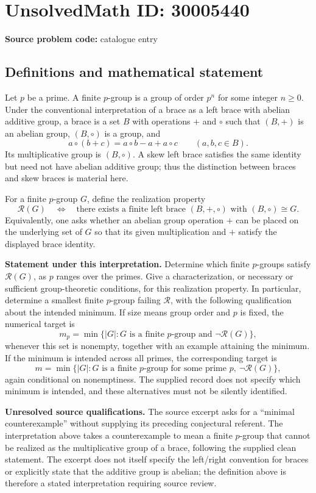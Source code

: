 \documentclass[11pt]{article}
\begin{document}
\section*{UnsolvedMath ID: 30005440}
\textbf{Source problem code:} catalogue entry
\subsection{Definitions and mathematical statement}
Let \(p\) be a prime. A finite \(p\)-group is a group of order \(p^n\) for some integer \(n\geq 0\). Under the conventional interpretation of a brace as a left brace with abelian additive group, a brace is a set \(B\) with operations \(+\) and \(\circ\) such that \((B,+)\) is an abelian group, \((B,\circ)\) is a group, and
\[
 a\circ(b+c)=a\circ b-a+a\circ c
 \qquad(a,b,c\in B).
\]
Its multiplicative group is \((B,\circ)\). A skew left brace satisfies the same identity but need not have abelian additive group; thus the distinction between braces and skew braces is material here.

For a finite \(p\)-group \(G\), define the realization property
\[
\mathcal R(G)\quad\Longleftrightarrow\quad
\text{there exists a finite left brace }(B,+,\circ)
\text{ with }(B,\circ)\cong G.
\]
Equivalently, one asks whether an abelian group operation \(+\) can be placed on the underlying set of \(G\) so that its given multiplication and \(+\) satisfy the displayed brace identity.

\textbf{Statement under this interpretation.} Determine which finite \(p\)-groups satisfy \(\mathcal R(G)\), as \(p\) ranges over the primes. Give a characterization, or necessary or sufficient group-theoretic conditions, for this realization property. In particular, determine a smallest finite \(p\)-group failing \(\mathcal R\), with the following qualification about the intended minimum. If size means group order and \(p\) is fixed, the numerical target is
\[
 m_p=\min\bigl\{|G|:G\text{ is a finite }p\text{-group and }\neg\mathcal R(G)\bigr\},
\]
whenever this set is nonempty, together with an example attaining the minimum. If the minimum is intended across all primes, the corresponding target is
\[
 m=\min\bigl\{|G|:G\text{ is a finite }p\text{-group for some prime }p,
 \ \neg\mathcal R(G)\bigr\},
\]
again conditional on nonemptiness. The supplied record does not specify which minimum is intended, and these alternatives must not be silently identified.

\textbf{Unresolved source qualifications.} The source excerpt asks for a ``minimal counterexample'' without supplying its preceding conjectural referent. The interpretation above takes a counterexample to mean a finite \(p\)-group that cannot be realized as the multiplicative group of a brace, following the supplied clean statement. The excerpt does not itself specify the left/right convention for braces or explicitly state that the additive group is abelian; the definition above is therefore a stated interpretation requiring source review.
\end{document}

